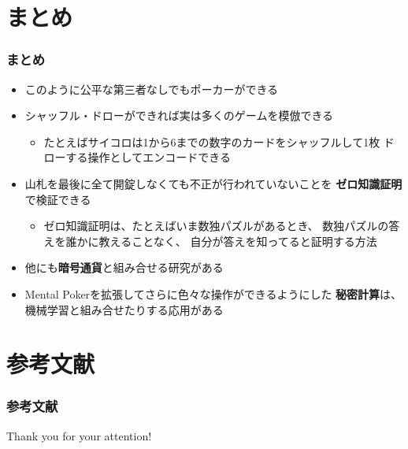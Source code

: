 \section{まとめ}

\begin{frame}
  \frametitle{まとめ}

  \pause
  \begin{itemize}
    \item<+-> このように公平な第三者なしでもポーカーができる
    \item<+-> シャッフル・ドローができれば実は多くのゲームを模倣できる
    \begin{itemize}
      \item たとえばサイコロは1から6までの数字のカードをシャッフルして1枚
      ドローする操作としてエンコードできる
    \end{itemize}

    \item<+-> 山札を最後に全て開錠しなくても不正が行われていないことを
    \textbf{ゼロ知識証明}で検証できる\cite{cmp}
    \begin{itemize}
      \item ゼロ知識証明は、たとえばいま数独パズルがあるとき、
      数独パズルの答えを誰かに教えることなく、
      自分が答えを知ってると証明する方法
    \end{itemize}

    \item<+-> 他にも\textbf{暗号通貨}と組み合せる研究\cite{Kumaresan}がある

    \item<+-> Mental Pokerを拡張してさらに色々な操作ができるようにした
    \textbf{秘密計算}は、機械学習と組み合せたりする応用\cite{ntt}がある
  \end{itemize}
\end{frame}

\section*{参考文献}

\begin{frame}[allowframebreaks]
  \frametitle{参考文献}

  
  
\end{frame}

\begin{frame}
  \centering
  {\Huge Thank you for your attention!}
\end{frame}


